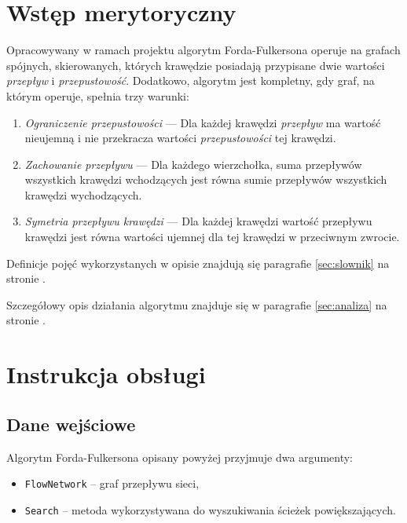 \documentclass[10pt]{dokument-tiwo}
\begin{document}
\MakeDokumentMeta


\section{Wstęp merytoryczny}

Opracowywany w ramach projektu algorytm Forda-Fulkersona operuje na grafach
spójnych, skierowanych, których krawędzie posiadają przypisane dwie wartości
\emph{przepływ} i \emph{przepustowość}. Dodatkowo, algorytm jest kompletny, gdy
graf, na którym operuje, spełnia trzy warunki:

\begin{enumerate}
    \item \emph{Ograniczenie przepustowości} --- Dla każdej krawędzi
    \emph{przepływ} ma wartość nieujemną i nie przekracza wartości
    \emph{przepustowości} tej krawędzi.
    \item \emph{Zachowanie przepływu} --- Dla każdego wierzchołka, suma
    przepływów wszystkich krawędzi wchodzących jest równa sumie przepływów
    wszystkich krawędzi wychodzących.
    \item \emph{Symetria przepływu krawędzi} --- Dla każdej krawędzi wartość
    przepływu krawędzi jest równa wartości ujemnej dla tej krawędzi w
    przeciwnym zwrocie.
\end{enumerate}

\noindent Definicje pojęć wykorzystanych w opisie znajdują się paragrafie
\ref{sec:slownik} na stronie \pageref{sec:slownik}.

\noindent Szczegółowy opis działania algorytmu znajduje się w paragrafie \ref{sec:analiza}
na stronie \pageref{sec:analiza}.


\section{Instrukcja obsługi}

\subsection{Dane wejściowe}
Algorytm Forda-Fulkersona opisany powyżej przyjmuje dwa argumenty:
\begin{itemize}
  \item \texttt{FlowNetwork} -- graf przepływu sieci,
  \item \texttt{Search} -- metoda wykorzystywana do wyszukiwania ścieżek
  powiększających.
\end{itemize}
\end{document}
